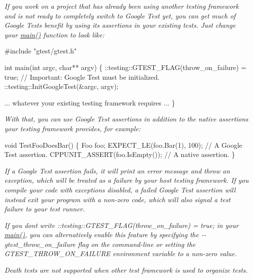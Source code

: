 {\itshape }

{\itshape If you work on a project that has already been using another testing framework and is not ready to completely switch to Google Test yet, you can get much of Google Test\textquotesingle{}s benefit by using its assertions in your existing tests. Just change your {\ttfamily \hyperlink{app_2main_8cpp_ae66f6b31b5ad750f1fe042a706a4e3d4}{main()}} function to look like\+:}

{\itshape 
\begin{DoxyCode}
#include "gtest/gtest.h"

int main(int argc, char** argv) \{
  ::testing::GTEST\_FLAG(throw\_on\_failure) = true;
  // Important: Google Test must be initialized.
  ::testing::InitGoogleTest(&argc, argv);

  ... whatever your existing testing framework requires ...
\}
\end{DoxyCode}
}

{\itshape With that, you can use Google Test assertions in addition to the native assertions your testing framework provides, for example\+:}

{\itshape 
\begin{DoxyCode}
void TestFooDoesBar() \{
  Foo foo;
  EXPECT\_LE(foo.Bar(1), 100);     // A Google Test assertion.
  CPPUNIT\_ASSERT(foo.IsEmpty());  // A native assertion.
\}
\end{DoxyCode}
}

{\itshape If a Google Test assertion fails, it will print an error message and throw an exception, which will be treated as a failure by your host testing framework. If you compile your code with exceptions disabled, a failed Google Test assertion will instead exit your program with a non-\/zero code, which will also signal a test failure to your test runner.}

{\itshape If you don\textquotesingle{}t write {\ttfamily \+::testing\+::\+G\+T\+E\+S\+T\+\_\+\+F\+L\+A\+G(throw\+\_\+on\+\_\+failure) = true;} in your {\ttfamily \hyperlink{app_2main_8cpp_ae66f6b31b5ad750f1fe042a706a4e3d4}{main()}}, you can alternatively enable this feature by specifying the {\ttfamily -\/-\/gtest\+\_\+throw\+\_\+on\+\_\+failure} flag on the command-\/line or setting the {\ttfamily G\+T\+E\+S\+T\+\_\+\+T\+H\+R\+O\+W\+\_\+\+O\+N\+\_\+\+F\+A\+I\+L\+U\+RE} environment variable to a non-\/zero value.}

{\itshape Death tests are {\itshape not} supported when other test framework is used to organize tests.}

